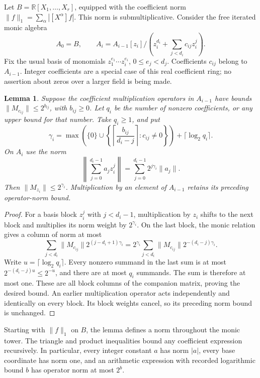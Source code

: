 \documentclass[11pt,a4paper]{article}
\newtheorem{lemma}[theorem]{Lemma}
\theoremstyle{definition}
\theoremstyle{remark}
\begin{document}
Let $B=\mathbb R[X_1,\ldots,X_r]$, equipped with the coefficient norm
$\|f\|_1=\sum_\alpha|[X^\alpha]f|$. This norm is submultiplicative.
Consider the free iterated monic algebra
\[
 A_0=B,\qquad
 A_i=A_{i-1}[z_i]\big/
 \left(z_i^{d_i}+\sum_{j<d_i}c_{ij}z_i^j\right).
\]
Fix the usual basis of monomials $z_1^{e_1}\cdots z_i^{e_i}$,
$0\le e_j<d_j$. Coefficients $c_{ij}$ belong to $A_{i-1}$.
Integer coefficients are a special case of this real coefficient ring;
no assertion about zeros over a larger field is being made.

\begin{lemma}\label{lem:weighted-companion-norm}
Suppose the coefficient multiplication operators in $A_{i-1}$ have
bounds $\|M_{c_{ij}}\|\le2^{b_{ij}}$, with $b_{ij}\ge0$.
Let $q_i$ be the number of nonzero coefficients, or any upper bound
for that number. Take $q_i\ge1$, and put
\[
 \gamma_i=
 \max\left(\{0\}\cup
   \left\{\left\lceil\frac{b_{ij}}{d_i-j}\right\rceil:
                  c_{ij}\ne0\right\}\right)
       +\lceil\log_2 q_i\rceil.
\]
On $A_i$ use the norm
\[
 \left\|\sum_{j=0}^{d_i-1}a_jz_i^j\right\|
               =\sum_{j=0}^{d_i-1}2^{j\gamma_i}\|a_j\|.
\]
Then $\|M_{z_i}\|\le2^{\gamma_i}$. Multiplication by an element
of $A_{i-1}$ retains its preceding operator-norm bound.
\end{lemma}
\begin{proof}
For a basis block $z_i^j$ with $j<d_i-1$, multiplication by $z_i$
shifts to the next block and multiplies its norm weight by
$2^{\gamma_i}$. On the last block, the monic relation gives a column
of norm at most
\[
 \sum_{j<d_i}\|M_{c_{ij}}\|2^{(j-d_i+1)\gamma_i}
 =2^{\gamma_i}
       \sum_{j<d_i}\|M_{c_{ij}}\|2^{-(d_i-j)\gamma_i}.
\]
Write $u=\lceil\log_2 q_i\rceil$. Every nonzero summand in the last
sum is at most $2^{-(d_i-j)u}\le2^{-u}$, and there are at most
$q_i$ summands. The sum is therefore at most one. These are all
block columns of the companion matrix, proving the desired bound.
An earlier multiplication operator acts independently and identically
on every block. Its block weights cancel, so its preceding norm bound
is unchanged.
\end{proof}

Starting with $\|f\|_1$ on $B$, the lemma defines a norm throughout
the monic tower. The triangle and product inequalities bound any
coefficient expression recursively. In particular, every integer
constant $a$ has norm $|a|$, every base coordinate has norm one, and
an arithmetic expression with recorded logarithmic bound $b$ has
operator norm at most $2^b$.
\end{document}
